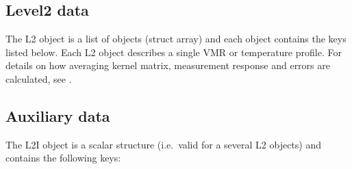 \subsection{Level2 data}

The L2 object is a list of objects (struct array) and each object contains the
keys listed below. Each L2 object describes a single VMR or temperature
profile. For details on how averaging kernel matrix, measurement response and
errors are calculated, see \citep{atbdl2}.



\subsection{Auxiliary data}

The L2I object is a scalar structure (i.e.\ valid for a several L2 objects)
and contains the following keys:



